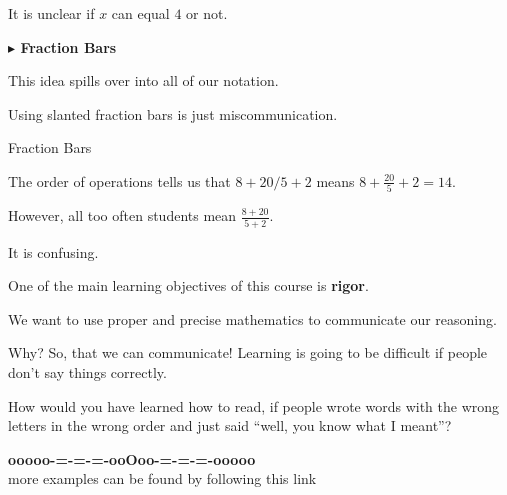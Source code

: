 \documentclass{ximera}
\begin{document}
It is unclear if $x$ can equal $4$ or not.




\textbf{\textcolor{blue!55!black}{$\blacktriangleright$ Fraction Bars}}

This idea spills over into all of our notation.

Using slanted fraction bars is just miscommunication.




\begin{example} Fraction Bars

The order of operations tells us that $8+20/5+2$ means $8 + \frac{20}{5} + 2 = 14$.

However, all too often students mean $\frac{8+20}{5+2} $.

It is confusing.

\end{example}



One of the main learning objectives of this course is \textbf{\textcolor{blue!55!black}{rigor}}.


We want to use proper and precise mathematics to communicate our reasoning.

Why? So, that we can communicate!  Learning is going to be difficult if people don't say things correctly.

How would you have learned how to read, if people wrote words with the wrong letters in the wrong order and just said ``well, you know what I meant''?
















\begin{onlineOnly}
\begin{center}
\textbf{\textcolor{green!50!black}{ooooo-=-=-=-ooOoo-=-=-=-ooooo}} \\

more examples can be found by following this link\\ 

\end{center}
\end{onlineOnly}
\end{document}
